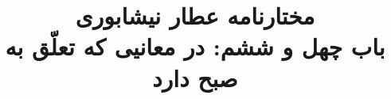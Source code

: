 \documentclass[14pt,b5paper]{article}
\begin{document}
\title{\Huge مختارنامه عطار نیشابوری \\
باب چهل و ششم: در معانیی که تعلّق به صبح دارد}
\author{ }
\date{ }
\maketitle
\newpage
\tableofcontents
\newpage

\newpage

\newpage

\newpage

\newpage

\newpage

\newpage

\newpage

\newpage

\newpage

\newpage

\newpage

\newpage

\newpage

\newpage

\newpage

\newpage

\newpage

\newpage

\newpage

\newpage

\newpage

\newpage

\newpage

\newpage

\newpage

\newpage

\newpage

\newpage

\newpage

\newpage

\newpage

\newpage

\newpage

\newpage

\newpage

\newpage

\newpage

\newpage

\newpage

\newpage

\newpage

\newpage

\newpage

\newpage
\end{document}

